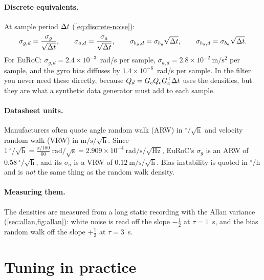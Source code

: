 \paragraph{Discrete equivalents.} At sample period ${\Delta t}$ (\cref{eq:discrete-noise}):
\begin{equation}
  \sigma_{g,d} = \frac{\sigma_g}{\sqrt{{\Delta t}}}, \qquad \sigma_{a,d} = \frac{\sigma_a}{\sqrt{{\Delta t}}}, \qquad
  \sigma_{b_g,d} = \sigma_{b_g}\sqrt{{\Delta t}}, \qquad \sigma_{b_a,d} = \sigma_{b_a}\sqrt{{\Delta t}} .
\end{equation}
For EuRoC: $\sigma_{g,d} = 2.4\times10^{-3}$~rad/s per sample, $\sigma_{a,d} = 2.8\times10^{-2}~\mathrm{m/s^2}$ per sample, and the gyro bias diffuses by
$1.4\times10^{-6}$~rad/s per sample. In the filter you never need these directly, because $Q_d = G_cQ_cG_c^{\mathsf{T}}{\Delta t}$ uses the densities, but they are what a synthetic
data generator must add to each sample.

\paragraph{Datasheet units.} Manufacturers often quote angle random walk (ARW) in $^\circ/\sqrt{\mathrm{h}}$ and velocity random walk (VRW) in $\mathrm{m/s/\sqrt{h}}$.
Since $1\ ^\circ/\sqrt{\mathrm{h}} = \frac{\pi/180}{60}~\mathrm{rad/\sqrt{s}} = 2.909\times10^{-4}~\mathrm{rad/s/\sqrt{Hz}}$, EuRoC's $\sigma_g$ is an ARW of $0.58\ ^\circ/\sqrt{\mathrm{h}}$,
and its $\sigma_a$ is a VRW of $0.12~\mathrm{m/s/\sqrt{h}}$. Bias instability is quoted in $^\circ/\mathrm{h}$ and is \emph{not} the same thing as the random walk
density.

\paragraph{Measuring them.} The densities are measured from a long static recording with the Allan variance (\cref{sec:allan,fig:allan}): white noise is read
off the slope $-\tfrac12$ at $\tau = 1$~s, and the bias random walk off the slope $+\tfrac12$ at $\tau = 3$~s.

\section{Tuning in practice}

